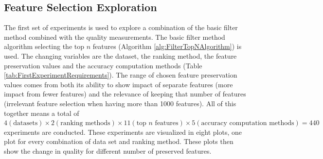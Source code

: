 	\subsection{Feature Selection Exploration}
	\label{subsec:FeatureSelectionExploration}
	
	The first set of experiments is used to explore a combination of the basic filter method combined with the quality measurements. The basic filter method algorithm selecting the top $n$ features (Algorithm \ref{alg:FilterTopNAlgorithm}) is used. The changing variables are the dataset, the ranking method, the feature preservation values and the accuracy computation methods (Table \ref{tab:FirstExperimentRequirements}). The range of chosen feature preservation values comes from both its ability to show impact of separate features (more impact from fewer features) and the relevance of keeping that number of features (irrelevant feature selection when having more than 1000 features). All of this together means a total of $4 (\text{datasets}) \times 2 (\text{ranking methods}) \times 11 (\text{top } n \text{ features}) \times 5 (\text{accuracy computation methods}) = 440$ experiments are conducted. These experiments are visualized in eight plots, one plot for every combination of data set and ranking method. These plots then show the change in quality for different number of preserved features.
	
